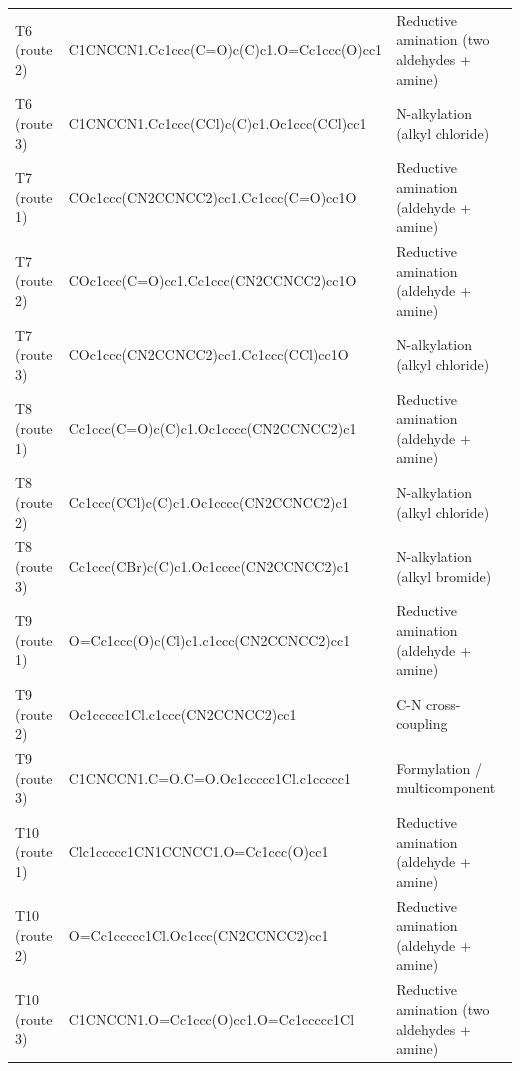 \begin{table}[htbp]
\begin{tabular}{l l l}
T6 (route 2) & C1CNCCN1.Cc1ccc(C=O)c(C)c1.O=Cc1ccc(O)cc1 & Reductive amination (two aldehydes + amine) \\
T6 (route 3) & C1CNCCN1.Cc1ccc(CCl)c(C)c1.Oc1ccc(CCl)cc1 & N-alkylation (alkyl chloride) \\
T7 (route 1) & COc1ccc(CN2CCNCC2)cc1.Cc1ccc(C=O)cc1O & Reductive amination (aldehyde + amine) \\
T7 (route 2) & COc1ccc(C=O)cc1.Cc1ccc(CN2CCNCC2)cc1O & Reductive amination (aldehyde + amine) \\
T7 (route 3) & COc1ccc(CN2CCNCC2)cc1.Cc1ccc(CCl)cc1O & N-alkylation (alkyl chloride) \\
T8 (route 1) & Cc1ccc(C=O)c(C)c1.Oc1cccc(CN2CCNCC2)c1 & Reductive amination (aldehyde + amine) \\
T8 (route 2) & Cc1ccc(CCl)c(C)c1.Oc1cccc(CN2CCNCC2)c1 & N-alkylation (alkyl chloride) \\
T8 (route 3) & Cc1ccc(CBr)c(C)c1.Oc1cccc(CN2CCNCC2)c1 & N-alkylation (alkyl bromide) \\
T9 (route 1) & O=Cc1ccc(O)c(Cl)c1.c1ccc(CN2CCNCC2)cc1 & Reductive amination (aldehyde + amine) \\
T9 (route 2) & Oc1ccccc1Cl.c1ccc(CN2CCNCC2)cc1 & C-N cross-coupling \\
T9 (route 3) & C1CNCCN1.C=O.C=O.Oc1ccccc1Cl.c1ccccc1 & Formylation / multicomponent \\
T10 (route 1) & Clc1ccccc1CN1CCNCC1.O=Cc1ccc(O)cc1 & Reductive amination (aldehyde + amine) \\
T10 (route 2) & O=Cc1ccccc1Cl.Oc1ccc(CN2CCNCC2)cc1 & Reductive amination (aldehyde + amine) \\
T10 (route 3) & C1CNCCN1.O=Cc1ccc(O)cc1.O=Cc1ccccc1Cl & Reductive amination (two aldehydes + amine) \\
\bottomrule
\end{tabular}
\end{table}
